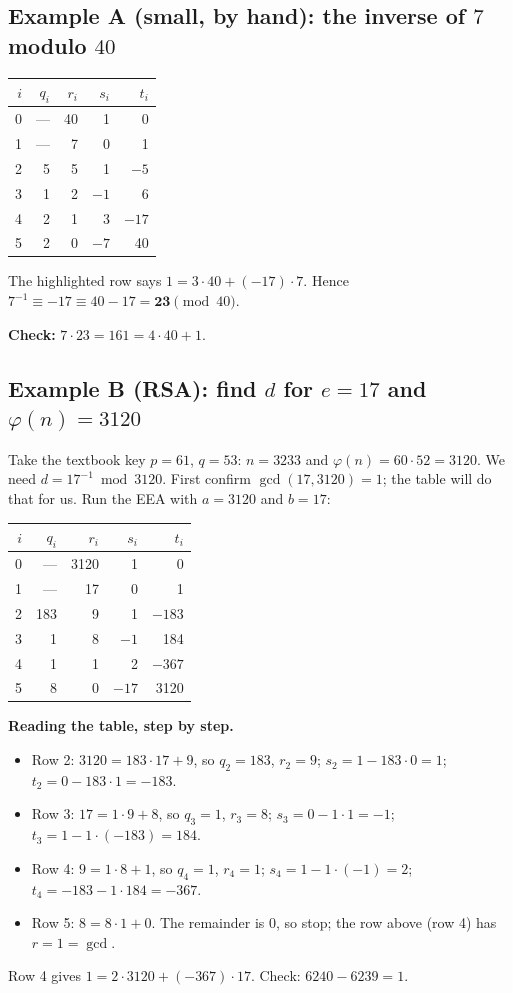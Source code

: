 \documentclass[11pt]{article}
\newcommand{\hl}{\rowcolor{green!15}}
\begin{document}
\subsection*{Example A (small, by hand): the inverse of $7$ modulo $40$}
\begin{center}
\renewcommand{\arraystretch}{1.2}
\begin{tabular}{@{}rrrrr@{}}
\toprule
$i$ & $q_i$ & $r_i$ & $s_i$ & $t_i$ \\
\midrule
0 & --- & 40 & 1 & 0 \\
1 & --- & 7 & 0 & 1 \\
2 & 5 & 5 & 1 & $-5$ \\
3 & 1 & 2 & $-1$ & 6 \\
\hl 4 & 2 & 1 & 3 & $-17$ \\
5 & 2 & 0 & $-7$ & 40 \\
\bottomrule
\end{tabular}
\end{center}
The highlighted row says $1=3\cdot40+(-17)\cdot7$. Hence $7^{-1}\equiv-17\equiv 40-17=\mathbf{23}\pmod{40}$.

\textbf{Check:} $7\cdot23=161=4\cdot40+1$. \checkmark

\subsection*{Example B (RSA): find $d$ for $e=17$ and $\varphi(n)=3120$}
Take the textbook key $p=61$, $q=53$: $n=3233$ and $\varphi(n)=60\cdot52=3120$. We need $d=17^{-1}\bmod 3120$. First confirm $\gcd(17,3120)=1$; the table will do that for us. Run the EEA with $a=3120$ and $b=17$:
\begin{center}
\renewcommand{\arraystretch}{1.2}
\begin{tabular}{@{}rrrrr@{}}
\toprule
$i$ & $q_i$ & $r_i$ & $s_i$ & $t_i$ \\
\midrule
0 & --- & 3120 & 1 & 0 \\
1 & --- & 17 & 0 & 1 \\
2 & 183 & 9 & 1 & $-183$ \\
3 & 1 & 8 & $-1$ & 184 \\
\hl 4 & 1 & 1 & 2 & $-367$ \\
5 & 8 & 0 & $-17$ & 3120 \\
\bottomrule
\end{tabular}
\end{center}
\textbf{Reading the table, step by step.}
\begin{itemize}[nosep]
\item Row 2: $3120=183\cdot17+9$, so $q_2=183$, $r_2=9$; $s_2=1-183\cdot0=1$; $t_2=0-183\cdot1=-183$.
\item Row 3: $17=1\cdot9+8$, so $q_3=1$, $r_3=8$; $s_3=0-1\cdot1=-1$; $t_3=1-1\cdot(-183)=184$.
\item Row 4: $9=1\cdot8+1$, so $q_4=1$, $r_4=1$; $s_4=1-1\cdot(-1)=2$; $t_4=-183-1\cdot184=-367$.
\item Row 5: $8=8\cdot1+0$. The remainder is $0$, so stop; the row above (row 4) has $r=1=\gcd$.
\end{itemize}
Row 4 gives $1=2\cdot3120+(-367)\cdot17$. Check: $6240-6239=1$. \checkmark
\end{document}
